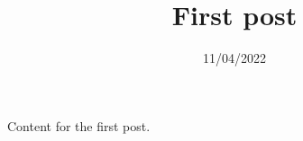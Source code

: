 \documentclass{post}
\title{First post}
\date{11/04/2022}
\begin{document}
Content for the first post.
\end{document}
